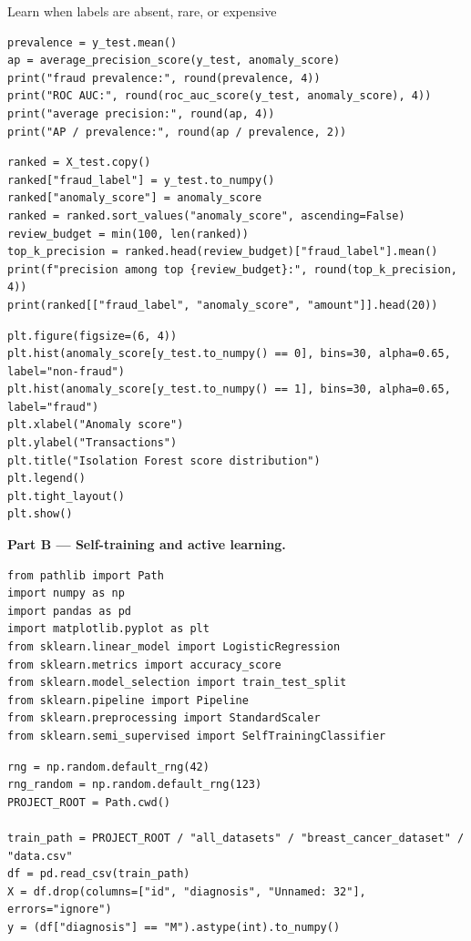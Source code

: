 \begin{labproject}{Learn when labels are absent, rare, or expensive}
\begin{lstlisting}[style=mlpython]
prevalence = y_test.mean()
ap = average_precision_score(y_test, anomaly_score)
print("fraud prevalence:", round(prevalence, 4))
print("ROC AUC:", round(roc_auc_score(y_test, anomaly_score), 4))
print("average precision:", round(ap, 4))
print("AP / prevalence:", round(ap / prevalence, 2))
\end{lstlisting}

\begin{lstlisting}[style=mlpython]
ranked = X_test.copy()
ranked["fraud_label"] = y_test.to_numpy()
ranked["anomaly_score"] = anomaly_score
ranked = ranked.sort_values("anomaly_score", ascending=False)
review_budget = min(100, len(ranked))
top_k_precision = ranked.head(review_budget)["fraud_label"].mean()
print(f"precision among top {review_budget}:", round(top_k_precision, 4))
print(ranked[["fraud_label", "anomaly_score", "amount"]].head(20))
\end{lstlisting}

\begin{lstlisting}[style=mlpython]
plt.figure(figsize=(6, 4))
plt.hist(anomaly_score[y_test.to_numpy() == 0], bins=30, alpha=0.65, label="non-fraud")
plt.hist(anomaly_score[y_test.to_numpy() == 1], bins=30, alpha=0.65, label="fraud")
plt.xlabel("Anomaly score")
plt.ylabel("Transactions")
plt.title("Isolation Forest score distribution")
plt.legend()
plt.tight_layout()
plt.show()
\end{lstlisting}

\medskip\noindent\textbf{Part B --- Self-training and active learning.}\par
\begin{lstlisting}[style=mlpython]
from pathlib import Path
import numpy as np
import pandas as pd
import matplotlib.pyplot as plt
from sklearn.linear_model import LogisticRegression
from sklearn.metrics import accuracy_score
from sklearn.model_selection import train_test_split
from sklearn.pipeline import Pipeline
from sklearn.preprocessing import StandardScaler
from sklearn.semi_supervised import SelfTrainingClassifier
\end{lstlisting}

\begin{lstlisting}[style=mlpython]
rng = np.random.default_rng(42)
rng_random = np.random.default_rng(123)
PROJECT_ROOT = Path.cwd()

train_path = PROJECT_ROOT / "all_datasets" / "breast_cancer_dataset" / "data.csv"
df = pd.read_csv(train_path)
X = df.drop(columns=["id", "diagnosis", "Unnamed: 32"], errors="ignore")
y = (df["diagnosis"] == "M").astype(int).to_numpy()
\end{lstlisting}


\end{labproject}
